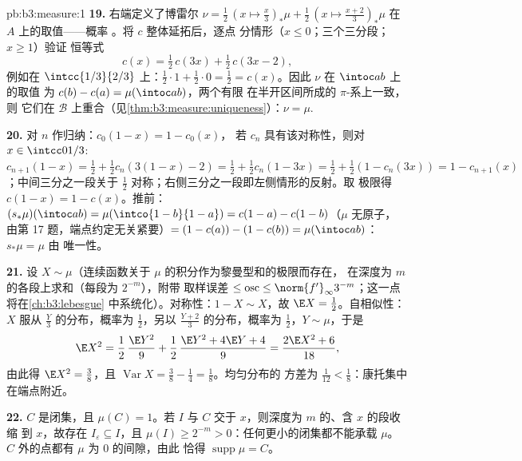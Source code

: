 \begin{solution}{pb:b3:measure:1}
\textbf{19.} 右端定义了博雷尔
$\nu = \frac12\,(x \mapsto \tfrac x3)_*\mu + \frac12\,(x
\mapsto \tfrac{x+2}3)_*\mu$ 在 $A$ 上的取值——概率
。将 $c$ 整体延拓后，逐点
分情形（$x \leq 0$；三个三分段；$x \geq 1$）验证
恒等式
\[
c(x) = \tfrac12\,c(3x) + \tfrac12\,c(3x - 2),
\]
例如在 $\intcc{1/3}{2/3}$ 上：$\frac12\cdot1 + \frac12\cdot0 =
\frac12 = c(x)$。因此 $\nu$ 在 $\intoc ab$ 上的取值
为 $c(b) - c(a) = \mu(\intoc ab)$，两个有限
在半开区间所成的 $\pi$-系上一致，则
它们在 $\mathcal B$ 上重合（见\cref{thm:b3:measure:uniqueness}）：$\nu =
\mu$.

\textbf{20.} 对 $n$ 作归纳：$c_0(1-x) = 1 - c_0(x)$，
若 $c_n$ 具有该对称性，则对 $x \in
\intcc0{1/3}$: $c_{n+1}(1 - x) = \frac12 + \frac12c_n(3(1-x)
- 2) = \frac12 + \frac12c_n(1 - 3x) = \frac12 + \frac12(1 -
c_n(3x)) = 1 - c_{n+1}(x)$；中间三分之一段关于
$\frac12$ 对称；右侧三分之一段即左侧情形的反射。取
极限得 $c(1-x) = 1 - c(x)$。推前：$(s_*\mu)(\intoc ab)
= \mu(\intco{1-b}{1-a}) = c(1-a) - c(1-b)$（$\mu$ 无原子，
由第 17 题，端点约定无关紧要）$= (1 -
c(a)) - (1 - c(b)) = \mu(\intoc ab)$：$s_*\mu = \mu$ 由
唯一性。

\textbf{21.} 设 $X \sim \mu$（连续函数关于
$\mu$ 的积分作为黎曼型和的极限而存在，
在深度为 $m$ 的各段上求和（每段为 $2^{-m}$），附带
取样误差 $\leq \operatorname{osc} \leq
\norm{f'}_\infty3^{-m}$；这一点将在\cref{ch:b3:lebesgue}
中系统化）。对称性：$1 - X \sim X$，故 $\E X =
\frac12$。自相似性：$X$ 服从 $\frac Y3$ 的分布，概率为
$\frac12$，另以 $\frac{Y+2}3$ 的分布，概率为
$\frac12$，$Y \sim \mu$，于是
\[
\E X^2 = \frac12\,\frac{\E Y^2}9 + \frac12\,
\frac{\E Y^2 + 4\E Y + 4}{9} = \frac{2\E X^2 + 6}{18},
\]
由此得 $\E X^2 = \frac38$，且 $\operatorname{Var}X = \frac38
- \frac14 = \frac18$。均匀分布的
方差为 $\frac1{12} < \frac18$：康托集中在端点附近。

\textbf{22.} $C$ 是闭集，且 $\mu(C) = 1$。若 $I$
与 $C$ 交于 $x$，则深度为 $m$ 的、含 $x$ 的段收缩
到 $x$，故存在 $I_\varepsilon \subseteq I$，且 $\mu(I) \geq
2^{-m} > 0$：任何更小的闭集都不能承载 $\mu$。
$C$ 外的点都有 $\mu$ 为 $0$ 的间隙，由此
恰得 $\operatorname{supp}\mu = C$。


\end{solution}

